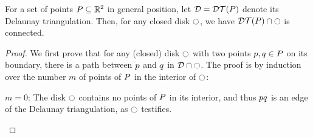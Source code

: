 \documentclass[12pt]{article}%
\begin{document}
\begin{claim}
    For a set of points $P \subseteq \mathbb{R}^2$ in general position, let
    $\DT = \DTX{\PS}$ denote its Delaunay triangulation.  Then, for
    any closed disk $\ocircle$, we have $\restrictY{\DTX{\PS}}{\disk}$ is
    connected.
\end{claim}


\begin{proof}
    We first prove that for any (closed) disk $\ocircle$ with two points
    $p,q\in P$ on its boundary, there is a path between $p$
    and $q$ in $\mathcal{D} \cap {\ocircle}$.  The proof is by induction
    over the number $m$ of points of $P$ in the interior of $\ocircle$:
    \begin{compactitem}
        \item $m=0$: The disk $\ocircle$ contains no points of $P$ in
        its interior, and thus $p q$ is an edge of the Delaunay
        triangulation, as $\ocircle$ testifies.


\end{compactitem}
\end{proof}
\end{document}

